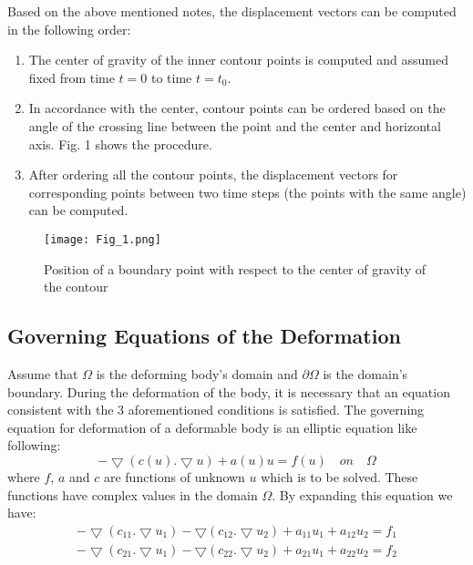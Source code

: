\documentclass{jicspack}
\begin{document}
Based on the above mentioned notes, the displacement vectors can be computed in the
following order:
\begin{enumerate}
\item The center of gravity of the inner contour points is computed and assumed fixed
from time $t=0$ to time $t=t_0$.
\item In accordance with the center, contour points can be ordered based on the angle of the crossing line between the point and the center and horizontal axis. Fig. 1
shows the procedure.
\item After ordering all the contour points, the displacement vectors for corresponding
points between two time steps (the points with the same angle) can be computed. 
\end{enumerate}

\begin{figure}
\centering
\texttt{[image: Fig\_1.png]}
\caption{Position of a boundary point with respect to the center of gravity of the contour}
\end{figure}

\subsection{Governing Equations of the Deformation}
Assume that $\Omega$ is the deforming body's domain and $\partial \Omega$ is the domain's boundary. During the deformation of the body, it is necessary that an equation consistent with the 3 aforementioned conditions is satisfied. The governing equation for deformation of a deformable body is an elliptic equation like following: 
\begin{equation}
-\bigtriangledown(c(u).\bigtriangledown u)+a(u)u=f(u) \quad on \quad \Omega
\end{equation}
where $f$, $a$ and $c$ are functions of unknown $u$ which is to be solved. These functions have complex values in the domain $\Omega$. By expanding this equation we have: 
\begin{equation}
\begin{split}
-\bigtriangledown(c_{11}. \bigtriangledown u_1)- \bigtriangledown(c_{12}. \bigtriangledown u_2)+a_{11}u_1+a_{12}u_2=f_1 \\
-\bigtriangledown(c_{21}. \bigtriangledown u_1)- \bigtriangledown(c_{22}. \bigtriangledown u_2)+a_{21}u_1+a_{22}u_2=f_2
\end{split}
\end{equation}
\end{document}
